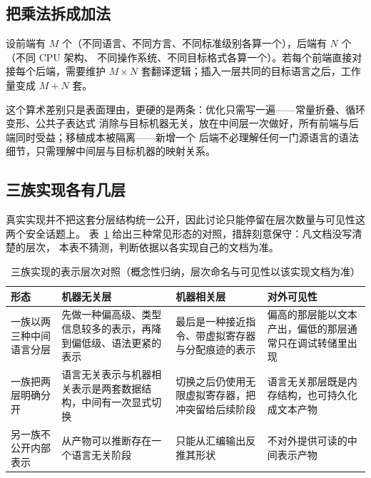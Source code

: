 \documentclass[12pt,a4paper,fontset=fandol]{ctexbook}
\begin{document}
\subsection{把乘法拆成加法}\label{sec:cl04-why-multiply}

设前端有 $M$ 个（不同语言、不同方言、不同标准级别各算一个），后端有 $N$ 个（不同 CPU 架构、
不同操作系统、不同目标格式各算一个）。若每个前端直接对接每个后端，需要维护 $M \times N$
套翻译逻辑；插入一层共同的目标语言之后，工作量变成 $M + N$ 套。

这个算术差别只是表面理由，更硬的是两条：优化只需写一遍——常量折叠、循环变形、公共子表达式
消除与目标机器无关，放在中间层一次做好，所有前端与后端同时受益；移植成本被隔离——新增一个
后端不必理解任何一门源语言的语法细节，只需理解中间层与目标机器的映射关系。

\subsection{三族实现各有几层}\label{sec:cl04-why-families}

真实实现并不把这套分层结构统一公开，因此讨论只能停留在层次数量与可见性这两个安全话题上。
表~\ref{tab:cl04-layers} 给出三种常见形态的对照，措辞刻意保守：凡文档没写清楚的层次，
本表不猜测，判断依据以各实现自己的文档为准。

\begin{table}[htbp]
  \centering
  \begin{tabular}{>{\raggedright\arraybackslash}p{} >{\raggedright\arraybackslash}p{} >{\raggedright\arraybackslash}p{} >{\raggedright\arraybackslash}p{}}
    \hline
    \textbf{形态} & \textbf{机器无关层} & \textbf{机器相关层} & \textbf{对外可见性} \\
    \hline
    一族以两三种中间语言分层 & 先做一种偏高级、类型信息较多的表示，再降到偏低级、语法更紧的表示 & 最后是一种接近指令、带虚拟寄存器与分配痕迹的表示 & 偏高的那层能以文本产出，偏低的那层通常只在调试转储里出现 \\
    \hline
    一族把两层明确分开 & 语言无关表示与机器相关表示是两套数据结构，中间有一次显式切换 & 切换之后仍使用无限虚拟寄存器，把冲突留给后续阶段 & 语言无关那层既是内存结构，也可持久化成文本产物 \\
    \hline
    另一族不公开内部表示 & 从产物可以推断存在一个语言无关阶段 & 只能从汇编输出反推其形状 & 不对外提供可读的中间表示产物 \\
    \hline
  \end{tabular}
  \caption{三族实现的表示层次对照（概念性归纳，层次命名与可见性以该实现文档为准）}
  \label{tab:cl04-layers}
\end{table}
\end{document}
